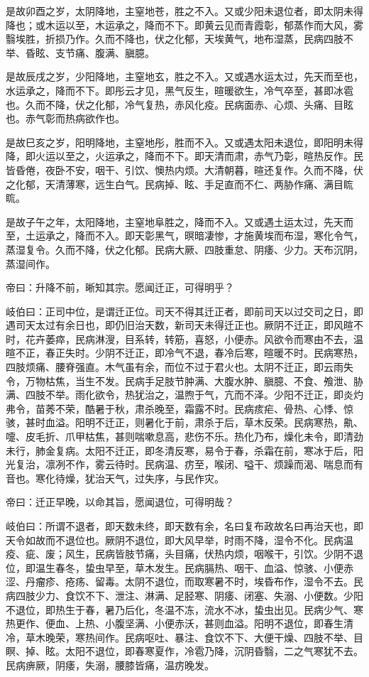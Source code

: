 \documentclass{article}%
\begin{document}
是故卯酉之岁，太阴降地，主窒地苍，胜之不入。又或少阳未退位者，即太阴未得降也；或木运以至，木运承之，降而不下。即黄云见而青霞彰，郁蒸作而大风，雾翳埃胜，折损乃作。久而不降也，伏之化郁，天埃黄气，地布湿蒸，民病四肢不举、昏眩、支节痛、腹满、䐜臆。

是故辰戌之岁，少阳降地，主窒地玄，胜之不入。又或遇水运太过，先天而至也，水运承之，降而不下。即彤云才见，黑气反生，暄暖欲生，冷气卒至，甚即冰雹也。久而不降，伏之化郁，冷气复热，赤风化疫。民病面赤、心烦、头痛、目眩也。赤气彰而热病欲作也。

是故巳亥之岁，阳明降地，主窒地彤，胜而不入。又或遇太阳未退位，即阳明未得降，即火运以至之，火运承之，降而不下。即天清而肃，赤气乃彰，暄热反作。民皆昏倦，夜卧不安，咽干、引饮、懊热内烦。大清朝暮，暄还复作。久而不降，伏之化郁，天清薄寒，远生白气。民病掉、眩、手足直而不仁、两胁作痛、满目䀮䀮。

是故子午之年，太阳降地，主窒地阜胜之，降而不入。又或遇土运太过，先天而至，土运承之，降而不入。即天彰黑气，暝暗凄惨，才施黄埃而布湿，寒化令气，蒸湿复令。久而不降，伏之化郁。民病大厥、四肢重怠、阴痿、少力。天布沉阴，蒸湿间作。

帝曰：升降不前，晰知其宗。愿闻迁正，可得明乎？

岐伯曰：正司中位，是谓迁正位。司天不得其迁正者，即前司天以过交司之日，即遇司天太过有余日也，即仍旧治天数，新司天未得迁正也。厥阴不迁正，即风暄不时，花卉萎瘁，民病淋溲，目系转，转筋，喜怒，小便赤。风欲令而寒由不去，温暄不正，春正失时。少阴不迁正，即冷气不退，春冷后寒，暄暖不时。民病寒热，四肢烦痛、腰脊强直。木气虽有余，而位不过于君火也。太阴不迁正，即云雨失令，万物枯焦，当生不发。民病手足肢节肿满、大腹水肿、䐜臆、不食、飧泄、胁满、四肢不举。雨化欲令，热犹治之，温煦于气，亢而不泽。少阳不迁正，即炎灼弗令，苗莠不荣，酷暑于秋，肃杀晚至，霜露不时。民病痎疟、骨热、心悸、惊骇，甚时血溢。阳明不迁正，则暑化于前，肃杀于后，草木反荣。民病寒热，鼽、嚏、皮毛折、爪甲枯焦，甚则喘嗽息高，悲伤不乐。热化乃布，燥化未令，即清劲未行，肺金复病。太阳不迁正，即冬清反寒，易令于春，杀霜在前，寒冰于后，阳光复治，凛冽不作，雾云待时。民病温、疠至，喉闭、嗌干、烦躁而渴、喘息而有音也。寒化待燥，犹治天气，过失序，与民作灾。

帝曰：迁正早晚，以命其旨，愿闻退位，可得明哉？

岐伯曰：所谓不退者，即天数未终，即天数有余，名曰复布政故名曰再治天也，即天令如故而不退位也。厥阴不退位，即大风早举，时雨不降，湿令不化。民病温疫、疵、废；风生，民病皆肢节痛，头目痛，伏热内烦，咽喉干，引饮。少阴不退位，即温生春冬，蛰虫早至，草木发生。民病膈热、咽干、血溢、惊骇、小便赤涩、丹瘤疹、疮疡、留毒。太阴不退位，而取寒暑不时，埃昏布作，湿令不去。民病四肢少力、食饮不下、泄注、淋满、足胫寒、阴痿、闭塞、失溺、小便数。少阳不退位，即热生于春，暑乃后化，冬温不冻，流水不冰，蛰虫出见。民病少气、寒热更作、便血、上热、小腹坚满、小便赤沃，甚则血溢。阳明不退位，即春生清冷，草木晚荣，寒热间作。民病呕吐、暴注、食饮不下、大便干燥、四肢不举、目瞑、掉、眩。太阳不退位，即春寒夏作，冷雹乃降，沉阴昏翳，二之气寒犹不去。民病痹厥，阴痿，失溺，腰膝皆痛，温疠晚发。
\end{document}
